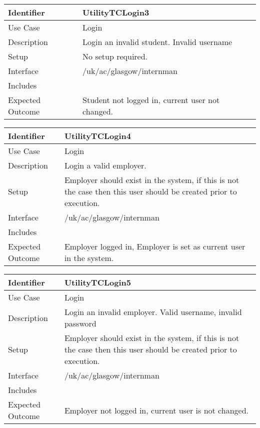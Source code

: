 \vspace{2em}

\begin{tabularx}{\textwidth}{|T|L|}
\hline
Identifier & UtilityTCLogin3\\
\hline
Use Case & Login \\
\hline
Description & Login an invalid student. Invalid username\\
\hline
Setup & No setup required.\\
\hline
Interface & /uk/ac/glasgow/internman \\
\hline
Includes & \\
\hline
Expected Outcome & Student not logged in, current user not changed.\\
\hline
\end{tabularx}

\vspace{2em}

\begin{tabularx}{\textwidth}{|T|L|}
\hline
Identifier & UtilityTCLogin4\\
\hline
Use Case & Login \\
\hline
Description & Login a valid employer. \\
\hline
Setup & Employer should exist in the system, if this is not the case
then this user should be created prior to execution. \\
\hline
Interface & /uk/ac/glasgow/internman \\
\hline
Includes & \\
\hline
Expected Outcome & Employer  logged in, Employer is set as current
user in the system. \\
\hline
\end{tabularx}

\vspace{2em}

\begin{tabularx}{\textwidth}{|T|L|}
\hline
Identifier & UtilityTCLogin5\\
\hline
Use Case & Login \\
\hline
Description & Login an invalid employer. Valid username, invalid password\\
\hline
Setup & Employer should exist in the system, if this is not the case
then this user should be created prior to execution. \\
\hline
Interface & /uk/ac/glasgow/internman \\
\hline
Includes & \\
\hline
Expected Outcome & Employer not logged in, current user is not
changed.\\
\hline
\end{tabularx}

